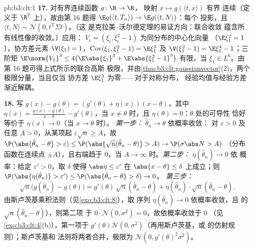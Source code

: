 \begin{solution}{pb:b3:clt:1}
\textbf{17.} 对有界连续函数 $g \colon \R \to \R$，
映射 $x \mapsto g(\langle t, x\rangle)$ 有界
连续（定义于 $\R^2$ 上），故由第 16 题得 $\E g(\langle
t, T_n\rangle) \to \E g(\langle t, N\rangle)$：每个
投影，且 $\langle t,
N\rangle \sim \mathcal N(0, t^{\mathsf T}\Sigma t)$。（这
是克拉美–沃尔德定理的易证方向：联合收敛
蕴含所有线性像的收敛。）应用：
$V_i = (\xi_i, \xi_i^2 - 1)$ 为同分布的中心化向量
（$\E\xi_1^2 = 1$），协方差元素 $\V(\xi_1) =
1$，$\operatorname{Cov}(\xi_1, \xi_1^2 - 1) = \E\xi_1^3$
及 $\V(\xi_1^2 - 1) = \E\xi_1^4 - 1$；三阶矩
$\E\norm{V_1}^3 \leq 4\bigl(\E\abs{\xi_1}^3 +
\E\abs{\xi_1^2 - 1}^3\bigr)$ 有限，当 $\xi_1 \in
L^6$。由第 16 题可得上式所示的联合高斯
极限，并由\cref{thm:b3:clt:gaussianvector}(2)，两个
极限分量，当且仅当
协方差 $\E\xi_1^3$ 为零——对于对称分布，
经验均值与经验方差
渐近解耦。

\textbf{18.} 写 $g(x) - g(\theta) = (g'(\theta) +
\eta(x))(x - \theta)$，其中 $\eta(x) = \frac{g(x) -
g(\theta)}{x - \theta} - g'(\theta)$，当 $x \neq \theta$
时，且 $\eta(\theta) = 0$：$\theta$ 处的可导性
恰好等价于 $\eta(x) \to 0$（当 $x \to \theta$ 时）。
\emph{第一步：} $\hat\theta_n \to \theta$ 依概率收敛：
对 $\varepsilon > 0$ 及任意 $A > 0$，从某项起
$\varepsilon\sqrt n \geq A$，故 $\P(\abs{\hat\theta_n -
\theta} > \varepsilon) \leq \P(\abs{\sqrt
n(\hat\theta_n - \theta)} > A) \to \P(\sigma\abs N > A)$
（分布函数在连续点
$\pm A$），且右端趋于 $0$，当 $A \to
\infty$ 时。\emph{第二步：} $\eta(\hat\theta_n) \to 0$ 依
概率：给定 $\varepsilon' > 0$，取 $\delta$ 使得
$\abs\eta \leq \varepsilon'$ 在 $\abs{x - \theta} \leq
\delta$ 上成立；则 $\P(\abs{\eta(\hat\theta_n)} > \varepsilon')
\leq \P(\abs{\hat\theta_n - \theta} > \delta) \to 0$。
\emph{第三步：}
\[
\sqrt n\bigl(g(\hat\theta_n) - g(\theta)\bigr) =
g'(\theta)\,\sqrt n(\hat\theta_n - \theta) +
\eta(\hat\theta_n)\cdot\sqrt n(\hat\theta_n - \theta) .
\]
由斯卢茨基乘积法则（见\cref{exo:b3:clt:8}），取
序列 $\eta(\hat\theta_n) \to 0$ 依概率收敛，且
的 $\sqrt n(\hat\theta_n - \theta)$），则第二项
于 $0\cdot\mathcal N(0,
\sigma^2) = 0$，故依概率收敛于 $0$
（见\cref{exo:b3:clt:4}(b)），第一项于
$g'(\theta)\mathcal N(0, \sigma^2)$（再用斯卢茨基，或
的仿射规则）；斯卢茨基和
法则将两者合并，极限为 $\mathcal N(0,
g'(\theta)^2\sigma^2)$。


\end{solution}
